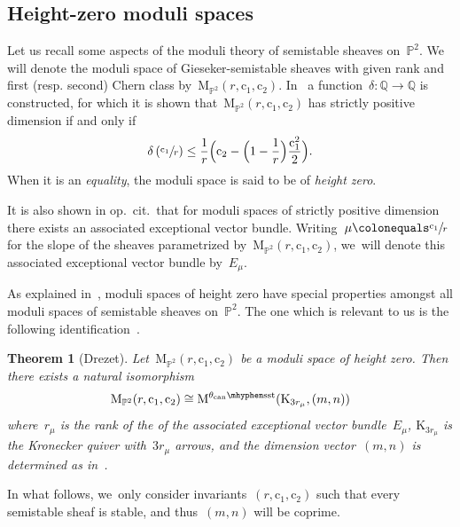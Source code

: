 \documentclass[11pt]{article}
\newcommand{\resp}{resp.\xspace}
\theoremstyle{plain}
\newtheorem{theorem}{Theorem}[section]
\theoremstyle{definition}
\newcommand\can{\ensuremath{\mathrm{can}}}
\newcommand\moduli{\ensuremath{\mathrm{M}}}
\newcommand\semistable{\ensuremath{\mhyphen\mathrm{sst}}}
\begin{document}
\subsection{Height-zero moduli spaces}
\label{subsection:height-zero}
Let us recall some aspects of the moduli theory of semistable sheaves on~$\mathbb{P}^2$.
We will denote
the moduli space of Gieseker-semistable sheaves with given rank and first (\resp second) Chern class
by~$\moduli_{\mathbb{P}^2}(r,\mathrm{c}_1,\mathrm{c}_2)$.
In~\cite{MR0916199} a function~$\delta\colon\mathbb{Q}\to\mathbb{Q}$ is constructed,
for which it is shown that~$\moduli_{\mathbb{P}^2}(r,\mathrm{c}_1,\mathrm{c}_2)$ has strictly positive dimension
if and only if
\begin{equation*}
\delta\left( \sfrac{\mathrm{c}_1}{r} \right)
\leq
\frac{1}{r}\Bigl( \mathrm{c}_2 - \Bigl( 1-\frac{1}{r} \Bigr)\frac{\mathrm{c}_1^2}{2} \Bigr).
\end{equation*}
When it is an \emph{equality},
the moduli space is said to be of \emph{height zero}.

It is also shown in op.~cit.~that for moduli spaces of strictly positive dimension
there exists an associated exceptional vector bundle.
Writing~$\mu\colonequals\sfrac{\mathrm{c}_1}{r}$ for the slope of the sheaves parametrized by~$\moduli_{\mathbb{P}^2}(r,\mathrm{c}_1,\mathrm{c}_2)$, we~will denote this associated exceptional vector bundle by~$E_\mu$.

As explained in~\cite{MR0916199},
moduli spaces of height zero have special properties
amongst all moduli spaces of semistable sheaves on~$\mathbb{P}^2$.
The one which is relevant to us is the following identification~\cite[Th.\,2]{MR0916199}.

\begin{theorem}[Drezet]
\label{theorem:identification}
Let~$\moduli_{\mathbb{P}^2}(r,\mathrm{c}_1,\mathrm{c}_2)$ be a moduli space of height zero.
Then there exists a natural isomorphism
\begin{equation*}
\moduli_{\mathbb{P}^2}(r,\mathrm{c}_1,\mathrm{c}_2)
\cong
\modulispace[\theta_\can\semistable]{\mathrm{K}_{3r_\mu},(m,n)}
\end{equation*}
where~$r_\mu$ is the rank of the of the associated exceptional vector bundle~$E_\mu$,
$\mathrm{K}_{3r_\mu}$ is the Kronecker quiver with~$3r_\mu$ arrows,
and the dimension vector~$(m,n)$ is determined as in~\cite[\S IV.2]{MR0916199}.
\end{theorem}

In what follows, we~only consider invariants~$(r,\mathrm{c}_1,\mathrm{c}_2)$
such that every semistable sheaf is stable,
and thus~$(m,n)$ will be coprime.
\end{document}
